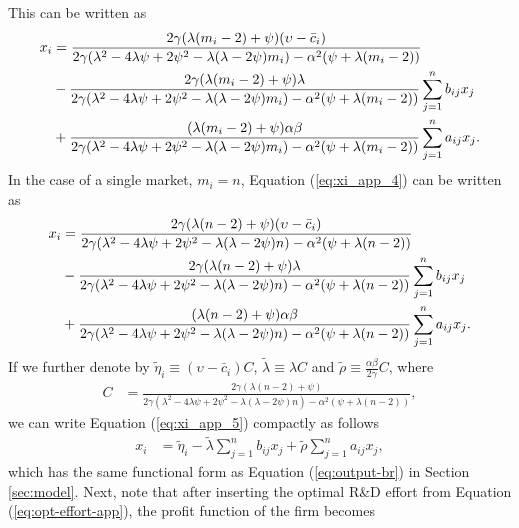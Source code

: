 This can be written as
\begin{align}
x_i & 
= 
\frac{
2 \gamma (\lambda (m_i-2)+\psi)(\upsilon-\bar{c}_i)
}{
2\gamma (\lambda^2 - 4\lambda\psi + 2\psi^2 - \lambda(\lambda - 2\psi)m_i) - \alpha^2 (\psi + \lambda (m_i - 2))
} 
\notag \\
& - 
\frac{
2 \gamma (\lambda (m_i-2)+\psi) \lambda
}{
2\gamma (\lambda^2 - 4\lambda\psi + 2\psi^2 - \lambda(\lambda - 2\psi)m_i) - \alpha^2 (\psi + \lambda (m_i - 2))
} 
\sum_{j=1}^n b_{ij} x_j 
\notag \\
& 
+ 
\frac{
(\lambda (m_i-2)+\psi) \alpha \beta
}{
2\gamma (\lambda^2 - 4\lambda\psi + 2\psi^2 - \lambda(\lambda - 2\psi)m_i) - \alpha^2 (\psi + \lambda (m_i - 2))
} 
\sum_{j=1}^n a_{ij} x_j.
\label{eq:xi_app_4}
\end{align}
In the case of a single market, $m_i=n$, Equation (\ref{eq:xi_app_4}) can be written as
\begin{align}
x_i & 
= 
\frac{
2 \gamma (\lambda (n-2)+\psi)(\upsilon-\bar{c}_i)
}{
2\gamma (\lambda^2 - 4\lambda\psi + 2\psi^2 - \lambda(\lambda - 2\psi)n) - \alpha^2 (\psi + \lambda (n - 2))
} 
\notag \\
& - 
\frac{
2 \gamma (\lambda (n-2)+\psi) \lambda
}{
2\gamma (\lambda^2 - 4\lambda\psi + 2\psi^2 - \lambda(\lambda - 2\psi)n) - \alpha^2 (\psi + \lambda (n- 2))
} 
\sum_{j=1}^n b_{ij} x_j 
\notag \\
& 
+ 
\frac{
(\lambda (n-2)+\psi) \alpha \beta
}{
2\gamma (\lambda^2 - 4\lambda\psi + 2\psi^2 - \lambda(\lambda - 2\psi)n) - \alpha^2 (\psi + \lambda (n - 2))
} 
\sum_{j=1}^n a_{ij} x_j.
\label{eq:xi_app_5}
\end{align}
If we further denote by $\tilde{\eta}_i \equiv (\upsilon - \bar{c}_i) C $, $\tilde{\lambda} \equiv \lambda C$ and $\tilde{\rho} \equiv \frac{\alpha \beta}{2 \gamma} C$, where
\begin{align}
C & = \frac{
2 \gamma (\lambda (n-2)+\psi)
}{
2\gamma (\lambda^2 - 4\lambda\psi + 2\psi^2 - \lambda(\lambda - 2\psi)n) - \alpha^2 (\psi + \lambda (n - 2))
},
\label{eq:C_app}
\end{align}
we can write Equation (\ref{eq:xi_app_5}) compactly as follows
\begin{align*}
x_i & = \tilde{\eta}_i - \tilde{\lambda} \sum_{j=1}^n b_{ij} x_j + \tilde{\rho}  \sum_{j=1}^n a_{ij} x_j,
\end{align*}
which has the same functional form as Equation (\ref{eq:output-br}) in Section \ref{sec:model}. Next, note that after inserting the optimal R\&D effort from Equation (\ref{eq:opt-effort-app}), the profit function of the firm becomes 
